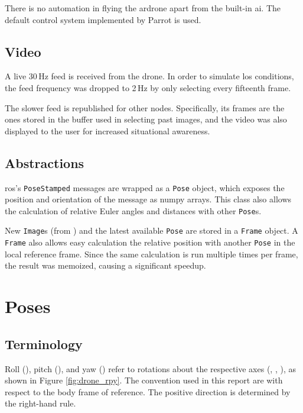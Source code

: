     There is no automation in flying the \gls{ardrone} apart from the built-in \gls{ai}.
    The default control system implemented by Parrot is used.

  \subsection{Video}
    A live 30\,Hz feed is received from the drone.
    In order to simulate \gls{los} conditions, the feed frequency was dropped to 2\,Hz by only selecting every fifteenth frame.

    The slower feed is republished for other nodes.
    Specifically, its frames are the ones stored in the buffer used in selecting past images, and the video was also displayed to the user for increased situational awareness.

  \subsection{Abstractions}
    \gls{ros}'s \texttt{PoseStamped} messages are wrapped as a \texttt{Pose} object, which exposes the position and orientation of the message as numpy arrays.
    This class also allows the calculation of relative Euler angles and distances with other \texttt{Pose}s.

    New \texttt{Image}s (from \texttt{}) and the latest available \texttt{Pose} are stored in a \texttt{Frame} object.
    A \texttt{Frame} also allows easy calculation the relative position with another \texttt{Pose} in the local reference frame.
    Since the same calculation is run multiple times per frame, the result was memoized, causing a significant speedup.
  

\section{Poses}
\label{sec:poses}
  \subsection{Terminology}
    Roll (), pitch (), and yaw () refer to rotations about the respective axes (, , ), as shown in Figure \ref{fig:drone_rpy}.
    The convention used in this report are with respect to the body frame of reference. The positive direction is determined by the right-hand rule.

